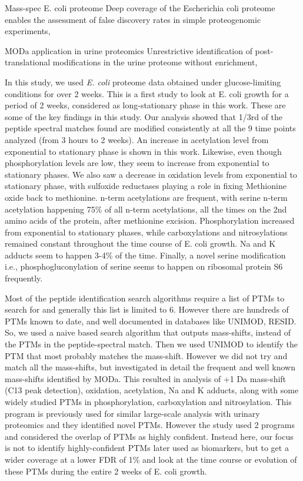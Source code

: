 \documentclass[12pt]{article}
\begin{document}
Mass-spec E. coli proteome \cite{Krugetal2013}
{Deep coverage of the Escherichia coli proteome enables the assessment of false discovery rates in simple proteogenomic experiments},

MODa application in urine proteomics \cite{Liuetal2013}
{Unrestrictive identification of post-translational modifications in the urine proteome without enrichment},

In this study, we used \emph{E. coli} proteome data obtained under glucose-limiting conditions for over 2 weeks. This is a first study to look at E. coli growth for a period of 2 weeks, considered as long-stationary phase in this work. These are some of the key findings in this study. Our analysis showed that 1/3rd of the peptide spectral matches found are modified consistently at all the 9 time points analyzed (from 3 hours to 2 weeks). An increase in acetylation level from exponential to stationary phase is shown in this work. Likewise, even though phosphorylation levels are low, they seem to increase from exponential to stationary phases. We also saw a decrease in oxidation levels from exponential to stationary phase, with sulfoxide reductases playing a role in fixing Methionine oxide back to methionine. n-term acetylations are frequent, with serine n-term acetylation happening 75\% of all n-term acetylations, all the times on the 2nd amino acids of the protein, after methionine excision. Phosphorylation increased from exponential to stationary phases, while carboxylations and nitrosylations remained constant throughout the time course of E. coli growth. Na and K adducts seem to happen 3-4\% of the time. Finally, a novel serine modification i.e., phosphogluconylation of serine seems to happen on ribosomal protein S6 frequently.

Most of the peptide identification search algorithms require a list of PTMs to search for and generally this list is limited to 6. However there are hundreds of PTMs known to date, and well documented in databases like UNIMOD, RESID. So, we used a naive based search algorithm that outputs mass-shifts, instead of the PTMs in the peptide-spectral match. Then we used UNIMOD to identify the PTM that most probably matches the mass-shift. However we did not try and match all the mass-shifts, but investigated in detail the frequent and well known mass-shifts identified by MODa. This resulted in analysis of +1 Da mass-shift (C13 peak detection), oxidation, acetylation, Na and K adducts, along with some widely studied PTMs in phosphorylation, carboxylation and nitrosylation. This program is previously used for similar large-scale analysis with urinary proteomics and they identified novel PTMs. However the study used 2 programs and considered the overlap of PTMs as highly confident. Instead here, our focus is not to identify highly-confident PTMs later used as biomarkers, but to get a wider coverage at a lower FDR of 1\% and look at the time course or evolution of these PTMs during the entire 2 weeks of E. coli growth.
\end{document}
